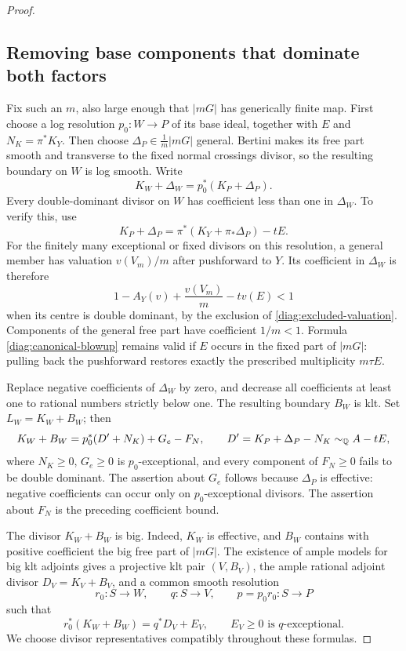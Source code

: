 \begin{proof}
\subsection*{Removing base components that dominate both factors}

Fix such an $m$, also large enough that $|mG|$ has generically finite
map.  First choose a log resolution $p_0:W\to P$ of its base ideal,
together with $E$ and $N_K=\pi^*K_Y$.  Then choose
$\Delta_P\in\frac1m|mG|$ general.  Bertini makes its free part smooth
and transverse to the fixed normal crossings divisor, so the resulting
boundary on $W$ is log smooth.  Write
\[
 K_W+\Delta_W=p_0^*(K_P+\Delta_P).
\]
Every double-dominant divisor on $W$ has coefficient less than one in
$\Delta_W$.  To verify this, use
\begin{equation}\label{diag:canonical-blowup}
 K_P+\Delta_P
  =\pi^*(K_Y+\pi_*\Delta_P)-tE.
\end{equation}
For the finitely many exceptional or fixed divisors on this resolution,
a general member has valuation $v(V_m)/m$ after pushforward to $Y$.
Its coefficient in $\Delta_W$ is therefore
\[
 1-A_Y(v)+\frac{v(V_m)}m-t v(E)<1
\]
when its centre is double dominant, by the exclusion of
\eqref{diag:excluded-valuation}.  Components of the general free part
have coefficient $1/m<1$.  Formula \eqref{diag:canonical-blowup} remains
valid if $E$ occurs in the fixed part of $|mG|$: pulling back the
pushforward restores exactly the prescribed multiplicity $m\tau E$.

Replace negative coefficients of $\Delta_W$ by zero, and decrease all
coefficients at least one to rational numbers strictly below one.
The resulting boundary $B_W$ is klt.  Set $L_W=K_W+B_W$; then
\begin{equation}\label{diag:adjusted-boundary}
 K_W+B_W=p_0^*(D'+N_K)+G_e-F_N,
 \qquad D'=K_P+\Delta_P-N_K\sim_\mathbb Q A-tE,
\end{equation}
where $N_K\ge0$, $G_e\ge0$ is $p_0$-exceptional, and every
component of $F_N\ge0$ fails to be double dominant.  The assertion about
$G_e$ follows because $\Delta_P$ is effective: negative coefficients
can occur only on $p_0$-exceptional divisors.  The assertion about $F_N$
is the preceding coefficient bound.

The divisor $K_W+B_W$ is big.  Indeed, $K_W$ is effective, and $B_W$
contains with positive coefficient the big free part of $|mG|$.
The existence of ample models for big klt adjoints
\citep{BCHM2010} gives a projective klt pair $(V,B_V)$, the ample
rational adjoint divisor $D_V=K_V+B_V$, and a common smooth resolution
\[
 r_0:S\to W,\qquad q:S\to V,\qquad p=p_0r_0:S\to P
\]
such that
\begin{equation}\label{diag:ample-model}
 r_0^*(K_W+B_W)=q^*D_V+E_V,
 \qquad E_V\ge0\text{ is }q\text{-exceptional}.
\end{equation}
We choose divisor representatives compatibly throughout these formulas.


\end{proof}
